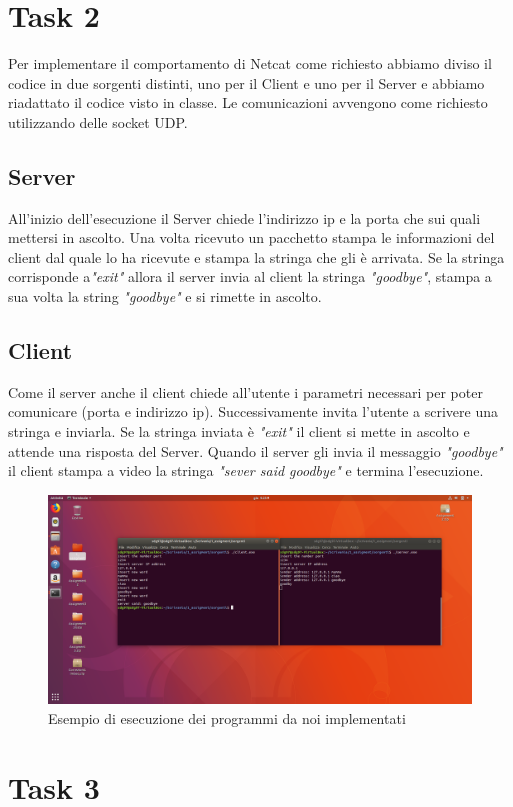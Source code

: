 \documentclass[a4paper]{article}
\begin{document}
\section{Task 2}
Per implementare il comportamento di Netcat come richiesto abbiamo diviso il codice in due sorgenti distinti, uno per il Client e uno per il Server e abbiamo riadattato il codice visto in classe. Le comunicazioni avvengono come richiesto utilizzando delle socket UDP.
\subsection{Server}
All'inizio dell'esecuzione il Server chiede l'indirizzo ip e la porta che sui quali mettersi in ascolto. Una volta ricevuto un pacchetto stampa le informazioni del client dal quale lo ha ricevute e stampa la stringa che gli è arrivata. Se la stringa corrisponde a\emph{"exit"} allora il server invia al client la stringa \emph{"goodbye"}, stampa a sua volta la string \emph{"goodbye"} e si rimette in ascolto. 
\subsection{Client}
Come il server anche il client chiede all'utente i parametri necessari per poter comunicare (porta e indirizzo ip). Successivamente invita l'utente a scrivere una stringa e inviarla. Se la stringa inviata è \emph{"exit"} il client si mette in ascolto e attende una risposta del Server. Quando il server gli invia il messaggio \emph{"goodbye"} il client stampa a video la stringa \emph{"sever said goodbye"} e termina l'esecuzione.

\begin{figure}[]
\includegraphics[scale = 0.30]{ClientServerDaMeSviluppati.png}
\centering
\caption{Esempio di esecuzione dei programmi da noi implementati}
\end{figure}
\newpage
\section{Task 3}
\end{document}
